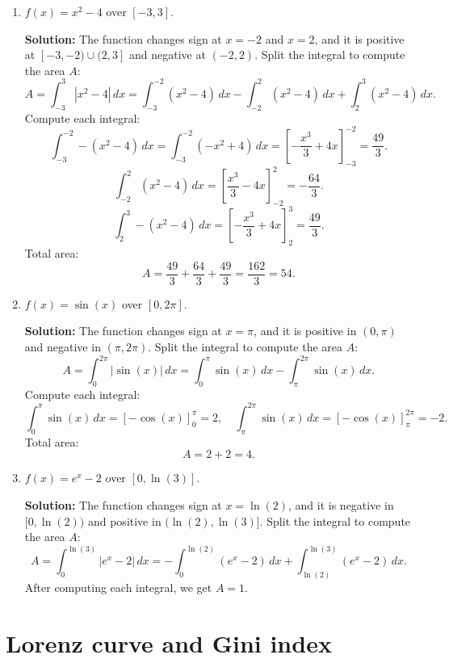 \documentclass{article}
\begin{document}
\begin{enumerate}[leftmargin=0.5cm, label=(\alph*), rightmargin=0.2cm]

    \item $f(x) = x^2 - 4$ over $[-3, 3]$.

    \textbf{Solution:} 
    The function changes sign at \(x = -2\) and \(x = 2\), and it is positive at $[-3, -2)\cup(2, 3]$ and negative at $(-2, 2)$. Split the integral to compute the area $A$:
    \[
    A = \int_{-3}^{3} |x^2 - 4| \, dx = \int_{-3}^{-2} (x^2 - 4) \, dx - \int_{-2}^{2} (x^2 - 4) \, dx + \int_{2}^{3} (x^2 - 4) \, dx.
    \]
    Compute each integral:
    \[
    \int_{-3}^{-2} -(x^2 - 4) \, dx = \int_{-3}^{-2} (-x^2 + 4) \, dx = \left[-\frac{x^3}{3} + 4x\right]_{-3}^{-2} = \frac{49}{3}.
    \]
    \[
    \int_{-2}^{2} (x^2 - 4) \, dx = \left[\frac{x^3}{3} - 4x\right]_{-2}^{2} = -\frac{64}{3}.
    \]
    \[
    \int_{2}^{3} -(x^2 - 4) \, dx = \left[-\frac{x^3}{3} + 4x\right]_{2}^{3} = \frac{49}{3}.
    \]
    Total area:
    \[
    A = \frac{49}{3} + \frac{64}{3} + \frac{49}{3} = \frac{162}{3} = 54.
    \]

    \item $f(x) = \sin(x)$ over $[0, 2\pi]$.

    \textbf{Solution:} 
    The function changes sign at \(x = \pi\), and it is positive in $(0, \pi)$ and negative in $(\pi,2\pi)$. Split the integral to compute the area $A$:
    \[
    A = \int_{0}^{2\pi} |\sin(x)| \, dx = \int_{0}^{\pi} \sin(x) \, dx - \int_{\pi}^{2\pi} \sin(x) \, dx.
    \]
    Compute each integral:
    \[
    \int_{0}^{\pi} \sin(x) \, dx = \left[-\cos(x)\right]_{0}^{\pi} = 2, \quad \int_{\pi}^{2\pi} \sin(x) \, dx = \left[-\cos(x)\right]_{\pi}^{2\pi} = -2.
    \]
    Total area:
    \[
    A = 2 + 2 = 4.
    \]

    \item $f(x) = e^x - 2$ over $[0, \ln(3)]$.

    \textbf{Solution:} 
    The function changes sign at \(x = \ln(2)\), and it is negative in $[0, \ln(2))$ and positive in $(\ln(2), \ln(3)]$. Split the integral to compute the area $A$:
    \[
    A = \int_{0}^{\ln(3)} |e^x - 2| \, dx = -\int_{0}^{\ln(2)} (e^x - 2) \, dx + \int_{\ln(2)}^{\ln(3)} (e^x - 2) \, dx.
    \]
    After computing each integral, we get $A = 1$.

\end{enumerate}

\section*{Lorenz curve and Gini index}
\end{document}
